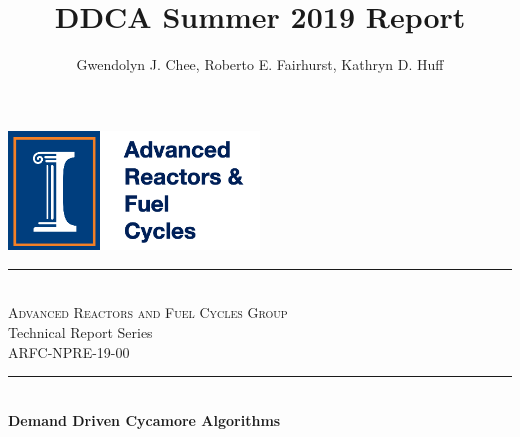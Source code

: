 \documentclass[11pt,letterpaper]{article}
\title{DDCA Summer 2019 Report}
\author{Gwendolyn J. Chee, Roberto E. Fairhurst, Kathryn D. Huff}
\begin{document}
	
\begin{titlepage} %
	\newcommand{\HRule}{\rule{\linewidth}{0.5mm}} %
	
	\center %
	
	
	\vfill\vfill
	\includegraphics[width=0.5\textwidth]{figures/logo.png} %
	
	
	
	\vspace{1cm}
	\HRule\\[0.4cm]
	\textsc{\Large Advanced Reactors and Fuel Cycles Group}\\
	{\Large Technical Report Series}\\ %
	
	{\large ARFC-NPRE-19-00}\\ %
	
	
	
	\HRule\\[0.4cm]
	
	{\huge\bfseries Demand Driven Cycamore Algorithms}\\[0.4cm] %
	

\end{titlepage}
\end{document}

